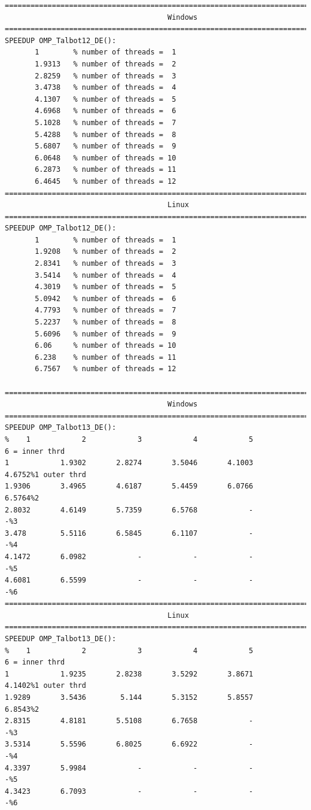 \documentclass[a4paper,10pt]{report}%
\begin{document}
\begin{lstlisting}
====================================================================================
                                      Windows
====================================================================================
SPEEDUP OMP_Talbot12_DE():
       1        % number of threads =  1
       1.9313   % number of threads =  2
       2.8259   % number of threads =  3
       3.4738   % number of threads =  4
       4.1307   % number of threads =  5
       4.6968   % number of threads =  6
       5.1028   % number of threads =  7
       5.4288   % number of threads =  8
       5.6807   % number of threads =  9
       6.0648   % number of threads = 10
       6.2873   % number of threads = 11
       6.4645   % number of threads = 12
====================================================================================
                                      Linux
====================================================================================
SPEEDUP OMP_Talbot12_DE():
       1        % number of threads =  1
       1.9208   % number of threads =  2
       2.8341   % number of threads =  3
       3.5414   % number of threads =  4
       4.3019   % number of threads =  5
       5.0942   % number of threads =  6
       4.7793   % number of threads =  7
       5.2237   % number of threads =  8
       5.6096   % number of threads =  9
       6.06     % number of threads = 10
       6.238    % number of threads = 11
       6.7567   % number of threads = 12

====================================================================================
                                      Windows
====================================================================================
SPEEDUP OMP_Talbot13_DE():
%    1            2            3            4            5            6 = inner thrd
1            1.9302       2.8274       3.5046       4.1003       4.6752%1 outer thrd
1.9306       3.4965       4.6187       5.4459       6.0766       6.5764%2
2.8032       4.6149       5.7359       6.5768            -            -%3
3.478        5.5116       6.5845       6.1107            -            -%4
4.1472       6.0982            -            -            -            -%5
4.6081       6.5599            -            -            -            -%6
====================================================================================
                                      Linux
====================================================================================
SPEEDUP OMP_Talbot13_DE():
%    1            2            3            4            5            6 = inner thrd
1            1.9235       2.8238       3.5292       3.8671       4.1402%1 outer thrd
1.9289       3.5436        5.144       5.3152       5.8557       6.8543%2
2.8315       4.8181       5.5108       6.7658            -            -%3
3.5314       5.5596       6.8025       6.6922            -            -%4
4.3397       5.9984            -            -            -            -%5
4.3423       6.7093            -            -            -            -%6
\end{lstlisting}
\end{document}
